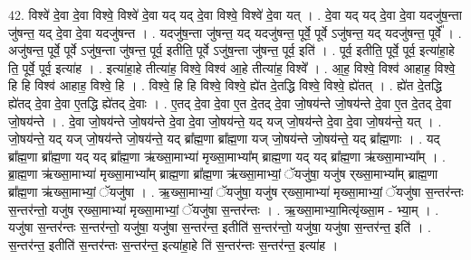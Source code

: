 \documentclass[17pt]{extarticle}
\begin{document}
42. विश्वे॑ दे॒वा दे॒वा विश्वे॒ विश्वे॑ दे॒वा यद् यद् दे॒वा विश्वे॒ विश्वे॑ दे॒वा यत् । . दे॒वा यद् यद् दे॒वा दे॒वा यदजु॑ष॒न्ता जु॑षन्त॒ यद् दे॒वा दे॒वा यदजु॑षन्त । . यदजु॑ष॒न्ता जु॑षन्त॒ यद् यदजु॑षन्त॒ पूर्वे॒ पूर्वे ऽजु॑षन्त॒ यद् यदजु॑षन्त॒ पूर्वे᳚ । . अजु॑षन्त॒ पूर्वे॒ पूर्वे ऽजु॑ष॒न्ता जु॑षन्त॒ पूर्व॒ इतीति॒ पूर्वे ऽजु॑ष॒न्ता जु॑षन्त॒ पूर्व॒ इति॑ । . पूर्व॒ इतीति॒ पूर्वे॒ पूर्व॒ इत्या॑हा॒हे ति॒ पूर्वे॒ पूर्व॒ इत्या॑ह । . इत्या॑हा॒हे तीत्या॑ह॒ विश्वे॒ विश्व॑ आ॒हे तीत्या॑ह॒ विश्वे᳚ । . आ॒ह॒ विश्वे॒ विश्व॑ आहाह॒ विश्वे॒ हि हि विश्व॑ आहाह॒ विश्वे॒ हि । . विश्वे॒ हि हि विश्वे॒ विश्वे॒ ह्ये॑त दे॒तद्धि विश्वे॒ विश्वे॒ ह्ये॑तत् । . ह्ये॑त दे॒तद्धि ह्ये॑तद् दे॒वा दे॒वा ए॒तद्धि ह्ये॑तद् दे॒वाः । . ए॒तद् दे॒वा दे॒वा ए॒त दे॒तद् दे॒वा जो॒षय॑न्ते जो॒षय॑न्ते दे॒वा ए॒त दे॒तद् दे॒वा जो॒षय॑न्ते । . दे॒वा जो॒षय॑न्ते जो॒षय॑न्ते दे॒वा दे॒वा जो॒षय॑न्ते॒ यद् यज् जो॒षय॑न्ते दे॒वा दे॒वा जो॒षय॑न्ते॒ यत् । . जो॒षय॑न्ते॒ यद् यज् जो॒षय॑न्ते जो॒षय॑न्ते॒ यद् ब्रा᳚ह्म॒णा ब्रा᳚ह्म॒णा यज् जो॒षय॑न्ते जो॒षय॑न्ते॒ यद् ब्रा᳚ह्म॒णाः । . यद् ब्रा᳚ह्म॒णा ब्रा᳚ह्म॒णा यद् यद् ब्रा᳚ह्म॒णा ऋ॑ख्सा॒माभ्या॑ मृख्सा॒माभ्या᳚म् ब्राह्म॒णा यद् यद् ब्रा᳚ह्म॒णा ऋ॑ख्सा॒माभ्या᳚म् । . ब्रा॒ह्म॒णा ऋ॑ख्सा॒माभ्या॑ मृख्सा॒माभ्या᳚म् ब्राह्म॒णा ब्रा᳚ह्म॒णा ऋ॑ख्सा॒माभ्यां॒ ॅयजु॑षा॒ 
यजु॑ष र्‌ख्सा॒माभ्या᳚म् ब्राह्म॒णा ब्रा᳚ह्म॒णा ऋ॑ख्सा॒माभ्यां॒ ॅयजु॑षा । . ऋ॒ख्सा॒माभ्यां॒ ॅयजु॑षा॒ यजु॑ष र्‌ख्सा॒माभ्या॑ मृख्सा॒माभ्यां॒ ॅयजु॑षा स॒न्तर॑न्तः स॒न्तर॑न्तो॒ यजु॑ष र्‌ख्सा॒माभ्या॑ मृख्सा॒माभ्यां॒ ॅयजु॑षा स॒न्तर॑न्तः । . ऋ॒ख्सा॒माभ्या॒मित्यृ॑ख्सा॒म - भ्या॒म् । . यजु॑षा स॒न्तर॑न्तः स॒न्तर॑न्तो॒ यजु॑षा॒ यजु॑षा स॒न्तर॑न्त॒ इतीति॑ स॒न्तर॑न्तो॒ यजु॑षा॒ यजु॑षा स॒न्तर॑न्त॒ इति॑ । . स॒न्तर॑न्त॒ इतीति॑ स॒न्तर॑न्तः स॒न्तर॑न्त॒ इत्या॑हा॒हे ति॑ स॒न्तर॑न्तः स॒न्तर॑न्त॒ इत्या॑ह । \newline
\end{document}
